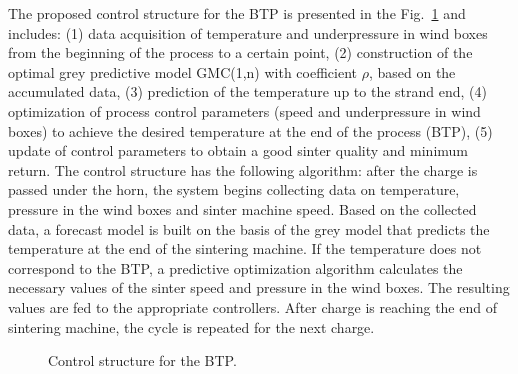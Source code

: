 \documentclass[AMS,STIX2COL]{WileyNJD-v2}
\begin{document}
The proposed control structure for the BTP is presented in the Fig.~\ref{fig:ControlStructure} and includes: (1) data acquisition of temperature and underpressure in wind boxes from the beginning of the process to a certain point, (2) construction of the optimal grey predictive model GMC(1,n) with coefficient $\rho$, based on the accumulated data, (3) prediction of the temperature up to the strand end, (4) optimization of process control parameters (speed and underpressure in wind boxes) to achieve the desired temperature at the end of the process (BTP), (5) update of control parameters to obtain a good sinter quality and minimum return.
The control structure has the following algorithm:  after the charge is passed under the horn, the system begins collecting data on temperature, pressure in the wind boxes and sinter machine speed. Based on the collected data, a forecast model is built on the basis of the grey model that predicts the temperature at the end of the sintering machine. If the temperature does not correspond to the BTP, a predictive optimization algorithm calculates the necessary values of the sinter speed and pressure in the wind boxes. The resulting values are fed to the appropriate controllers. After charge is reaching the end of sintering machine, the cycle is repeated for the next charge. 
\begin{figure}[htbp]
	\centering
	\caption{Control structure for the BTP.} \label{fig:ControlStructure}
\end{figure}
\end{document}
